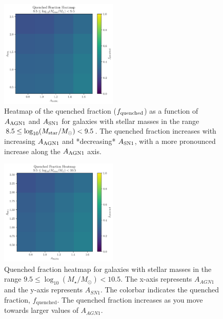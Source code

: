 \documentclass[twocolumn]{aastex631}
\begin{document}
\begin{figure}[h!]
    \centering
    \includegraphics[width=0.5\textwidth]{../Project6/plots/fquenched_heatmap_SN1_AGN1_8_5_10_M_star_M_9_5_20250424_133935.png}
    \caption{\label{fig:heatmap_fquenched} Heatmap of the quenched fraction ($f_{\rm quenched}$) as a function of $A_{\rm AGN1}$ and $A_{\rm SN1}$ for galaxies with stellar masses in the range $8.5 \leq \log_{10}(M_{\rm star}/M_{\odot}) < 9.5$. The quenched fraction increases with increasing $A_{\rm AGN1}$ and *decreasing* $A_{\rm SN1}$, with a more pronounced increase along the $A_{\rm AGN1}$ axis.
}
\end{figure}

\begin{figure}[h!]
    \centering
    \includegraphics[width=0.5\textwidth]{../Project6/plots/fquenched_heatmap_SN1_AGN1_9_5_10_M_star_M_10_5_20250424_133935.png}
    \caption{\label{fig:heatmap_fquenched_2} Quenched fraction heatmap for galaxies with stellar masses in the range $9.5 \leq \log_{10}(M_{\star}/M_{\odot}) < 10.5$. The x-axis represents $A_{AGN1}$ and the y-axis represents $A_{SN1}$. The colorbar indicates the quenched fraction, $f_{\mathrm{quenched}}$. The quenched fraction increases as you move towards larger values of $A_{AGN1}$.
}
\end{figure}
\end{document}
